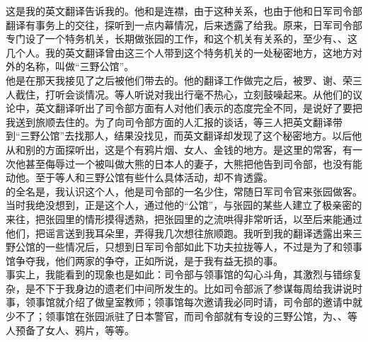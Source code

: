 这是我的英文翻译告诉我的。他和是连襟，由于这种关系，也由于他和日军司令部翻译有事务上的交往，探听到一点内幕情况，后来透露了给我。原来，日军司令部专门设了一个特务机关，长期做张园的工作，和这个机关有关系的，至少有、、这几个人。我的英文翻译曾由这三个人带到这个特务机关的一处秘密地方，这地方对外的名称，叫做“三野公馆”。\\

他是在那天我接见了之后被他们带去的。他的翻译工作做完之后，被罗、谢、荣三人截住，打听会谈情况。等人听说对我出行毫不热心，立刻鼓噪起来。从他们的议论中，英文翻译听出了司令部方面有人对他们表示的态度完全不同，是说好了要把我送到旅顺去住的。为了向司令部方面的人汇报的谈话，等三人把英文翻译带到“三野公馆”去找那人，结果没找见，而英文翻译却发现了这个秘密地方。以后他从和别的方面探听出，这是个有鸦片烟、女人、金钱的地方。是这里的常客，有一次他甚至侮辱过一个被叫做大熊的日本人的妻子，大熊把他告到司令部，也没有能动他。至于等人和三野公馆有些什么具体活动，却不肯透露。\\

的全名是，我认识这个人，他是司令部的一名少住，常随日军司令官来张园做客。当时我绝没想到，正是这个人，通过他的“公馆”，与张园的某些人建立了极亲密的来往，把张园里的情形摸得透熟，把张园里的之流哄得非常听话，以至后来能通过他们，把谣言送到我耳朵里，弄得我几次想往旅顺跑。我听到我的翻译透露出来三野公馆的一些情况后，只想到日军司令部如此下功夫拉拢等人，不过是为了和领事馆争夺我，他们两家的争夺，正如所说，是于我有益无损的事。\\

事实上，我能看到的现象也是如此：司令部与领事馆的勾心斗角，其激烈与错综复杂，是不下于我身边的遗老们中间所发生的。比如司令部派了参谋每周给我讲说时事，领事馆就介绍了做皇室教师；领事馆每次邀请我必同时请，司令部的邀请中就少不了；领事馆在张园派驻了日本警官，而司令部就有专设的三野公馆，为、、等人预备了女人、鸦片，等等。\\

